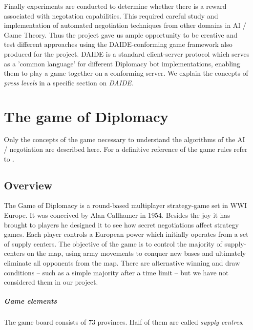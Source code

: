 \documentclass[pdftex,12pt,a4paper]{report}
\begin{document}
Finally experiments are conducted to determine whether there is a
reward associated with negotation capabilities. This required careful
study and implementation of automated negotiation techniques from
other domains in AI / Game Theory. Thus the project gave us ample
opportunity to be creative and test different approaches using the
DAIDE-conforming game framework also produced for the project. DAIDE
is a standard client-server protocol \cite{DaideWeb} which serves as a
'common language' for different Diplomacy bot implementations,
enabling them to play a game together on a conforming server. We
explain the concepts of \textit{press levels} in a specific section on
\textit{DAIDE}.


\pagebreak

\chapter{The game of Diplomacy}

Only the concepts of the game necessary to understand the 
algorithms of the AI / negotiation are described here. For a
definitive reference of the game rules refer to \cite{DiploRules00}.

\section{Overview}

The Game of Diplomacy is a round-based multiplayer strategy-game set
in WWI Europe. It was conceived by Alan Callhamer in 1954. Besides
the joy it has brought to players he designed it to see how 
secret negotiations affect strategy games. Each player controls a 
European power which initially operates from a set of supply centers.
The objective of the game is to control the majority of supply-centers
on the map, using army movements to conquer new bases and ultimately
eliminate all opponents from the map. There are alternative winning
and draw conditions -- such as a simple majority after a time limit -- 
but we have not considered them in our project.

\paragraph{Game elements}

The game board consists of 73 provinces. Half of them are 
called \textit{supply centres}.
\end{document}

